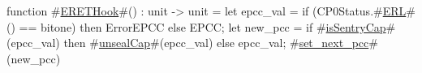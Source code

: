 function #\hyperref[zERETHook]{ERETHook}#() : unit -> unit =
  {
    let epcc_val = if (CP0Status.#\hyperref[zERL]{ERL}#() == bitone) then ErrorEPCC else EPCC;
    let new_pcc = if #\hyperref[zisSentryCap]{isSentryCap}#(epcc_val) then #\hyperref[zunsealCap]{unsealCap}#(epcc_val) else epcc_val;
    #\hyperref[zsetzynextzypcc]{set\_next\_pcc}#(new_pcc)
  }
